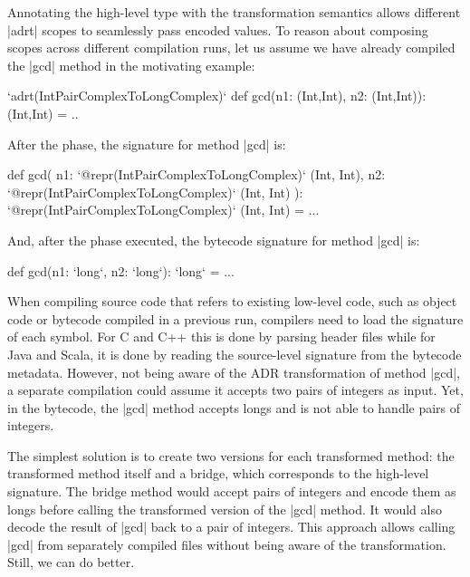 Annotating the high-level type with the transformation semantics allows different |adrt| scopes to seamlessly pass encoded values. To reason about composing scopes across different compilation runs, let us assume we have already compiled the |gcd| method in the motivating example:

\begin{lstlisting-nobreak}
`adrt(IntPairComplexToLongComplex)` {
  def gcd(n1: (Int,Int), n2: (Int,Int)): (Int,Int) = ..
}
\end{lstlisting-nobreak}

After the \inject{} phase, the signature for method |gcd| is:

\begin{lstlisting-nobreak}
def gcd(
    n1: `@repr(IntPairComplexToLongComplex)` (Int, Int),
    n2: `@repr(IntPairComplexToLongComplex)` (Int, Int)
  ): `@repr(IntPairComplexToLongComplex)` (Int, Int) = ...
\end{lstlisting-nobreak}

And, after the \commit{} phase executed, the bytecode signature for method |gcd| is:

\begin{lstlisting-nobreak}
def gcd(n1: `long`, n2: `long`): `long` = ...
\end{lstlisting-nobreak}

When compiling source code that refers to existing low-level code, such as object code or bytecode compiled in a previous run, compilers need to load the signature of each symbol. For C and C++ this is done by parsing header files while for Java and Scala, it is done by reading the source-level signature from the bytecode metadata. However, not being aware of the ADR transformation of method |gcd|, a separate compilation could assume it accepts two pairs of integers as input. Yet, in the bytecode, the |gcd| method accepts longs and is not able to handle pairs of integers.

The simplest solution is to create two versions for each transformed method: the transformed method itself and a bridge, which corresponds to the high-level signature. The bridge method would accept pairs of integers and encode them as longs before calling the transformed version of the |gcd| method. It would also decode the result of |gcd| back to a pair of integers. This approach allows calling |gcd| from separately compiled files without being aware of the transformation. Still, we can do better.

